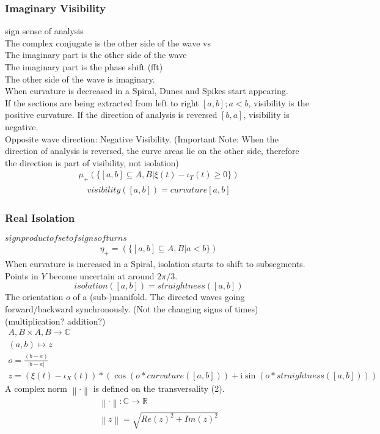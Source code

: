 \documentclass{article}
\newcommand\norm[1]{\left\lVert#1\right\rVert}
\begin{document}
\subsubsection{Imaginary Visibility}
sign sense of analysis\\
The complex conjugate is the other side of the wave vs\\
The imaginary part is the other side of the wave\\
The imaginary part is the phase shift (fft)\\
The other side of the wave is imaginary.\\
When curvature is decreased in a Spiral, Dunes and Spikes start appearing.\\
If the sections are being extracted from left to right $[a,b];a<b$, visibility is the positive curvature. If the direction of analysis is reversed $[b,a]$, visibility is negative.\\
Opposite wave direction: Negative Visibility.
(Important Note: When the direction of analysis is reversed, the curve areas lie on the other side, therefore the direction is part of visibility, not isolation)
\begin{align}
\mu_{+}(\{[a,b] \subseteq A,B \vert \xi(t) -\iota_{T}(t)\geq0\})
\end{align}
\begin{align}
visibility([a,b])=curvature[a,b]
\end{align}

\subsubsection{Real Isolation}
$sign product of set of signs of turns$\\
\begin{align}
\eta_{+}=(\{[a,b] \subseteq A,B \vert a<b\})
\end{align}
When curvature is increased in a Spiral, isolation starts to shift to subsegments. Points in $Y$ become uncertain at around $2\pi/3$.
\begin{equation}
isolation([a,b])=straightness([a,b])
\end{equation}
The orientation $o$ of a (sub-)manifold. The directed waves going forward/backward synchronously. (Not the changing signs of times)
(multiplication? addition?)
\begin{align}
A,B \times A,B \rightarrow \mathbb{C}\\
(a,b) \mapsto z\\
o = \frac{(b-a)}{\lvert b-a \rvert}\\
z =  (\xi(t)-\iota_{X}(t))*(\cos{(o*curvature([a,b]))} +\mathrm{i} \sin{(o*straightness([a,b]))})
\end{align}
A complex norm $\norm{\cdot}$ is defined on the transversality (2).
\begin{align}
\norm{\cdot} : \mathbb{C} \rightarrow \mathbb{R}\\
\norm{z} = \sqrt{Re(z)^2+Im(z)^2}
\end{align}
\end{document}
